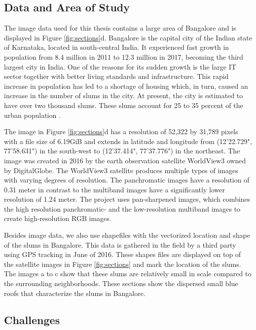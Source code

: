 \subsection{Data and Area of Study}
The image data used for this thesis contains a large area of Bangalore and is displayed in Figure \ref{fig:sections}d. Bangalore is the capital city of the Indian state of Karnataka, located in south-central India. It experienced fast growth in population from 8.4 million in 2011 to 12.3 million in 2017, becoming the third largest city in India\cite{popcount2017}. One of the reasons for its sudden growth is the large IT sector together with better living standards and infrastructure. This rapid increase in population has led to a shortage of housing which, in turn, caused an increase in the number of slums in the city. At present, the city is estimated to have over two thousand slums. These slums account for 25 to 35 percent of the urban population \cite{roy2018survey}.

The image in Figure \ref{fig:sections}d has a resolution of 52,322 by 31,789 pixels with a file size of 6.19GiB and extends in latitude and longitude from  (12'22.729", 77'58.631") in the south-west to (12'37.414", 77'37.776") in the northeast. The image was created in 2016 by the earth observation satellite WorldView3 owned by DigitalGlobe. The WorldView3 satellite produces multiple types of images with varying degrees of resolution. The panchromatic images have a resolution of 0.31 meter in contrast to the multiband images have a significantly lower resolution of 1.24 meter. The project uses pan-sharpened images, which combines the high resolution panchromatic- and the low-resolution multiband images to create high-resolution RGB images.

Besides image data, we also use shapefiles with the vectorized location and shape of the slums in Bangalore. This data is gathered in the field by a third party using GPS tracking in June of 2016. These shapes files are displayed on top of the satellite images in Figure \ref{fig:sections} and mark the location of the slums. The images a to c show that these slums are relatively small in scale compared to the surrounding neighborhoods. These sections show the dispersed small blue roofs that characterize the slums in Bangalore. 

\subsection{Challenges}


